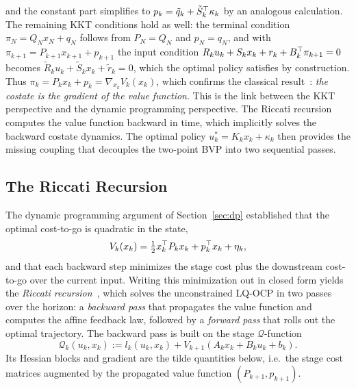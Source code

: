 and the constant part simplifies to $p_k = \tilde{q}_k + \tilde{S}_k^\top \kappa_k$ by an analogous calculation.
The remaining KKT conditions hold as well: the terminal condition $\pi_N = Q_N x_N + q_N$ follows from $P_N = Q_N$ and $p_N = q_N$, and with $\pi_{k+1} = P_{k+1} x_{k+1} + p_{k+1}$ the input condition $R_k u_k + S_k x_k + r_k + B_k^\top \pi_{k+1} = 0$ becomes $\tilde{R}_k u_k + \tilde{S}_k x_k + \tilde{r}_k = 0$, which the optimal policy satisfies by construction.
Thus $\pi_k = P_k x_k + p_k = \nabla_{x_k} V_k(x_k)$, which confirms the classical result~\cite{bryson1975applied}:
\textit{the costate is the gradient of the value function}.
This is the link between the KKT perspective and the dynamic programming perspective.
The Riccati recursion computes the value function backward in time, which implicitly solves the backward costate dynamics.
The optimal policy $u_k^* = K_k x_k + \kappa_k$ then provides the missing coupling that decouples the two-point BVP into two sequential passes.

\subsection{The Riccati Recursion}
\label{sec:riccati}

The dynamic programming argument of Section~\ref{sec:dp} established that the
optimal cost-to-go is quadratic in the state,
\[
V_k(x_k) = \tfrac{1}{2} x_k^\top P_k x_k + p_k^\top x_k + \eta_k ,
\]
and that each backward step minimizes the stage cost plus the downstream
cost-to-go over the current input. Writing this minimization out in closed form
yields the \textit{Riccati recursion}~\cite{frison2020hpipm,frison2015algorithms}, which solves the unconstrained LQ-OCP in
two passes over the horizon: a \textit{backward pass} that propagates the value
function and computes the affine feedback law, followed by a \textit{forward pass}
that rolls out the optimal trajectory.
The backward pass is built on the stage $\mathcal{Q}$-function
\[
\mathcal{Q}_k(u_k, x_k) := l_k(u_k, x_k) + V_{k+1}(A_k x_k + B_k u_k + b_k) .
\]
Its Hessian blocks and gradient are the tilde quantities below, i.e.\ the stage
cost matrices augmented by the propagated value function $(P_{k+1}, p_{k+1})$.

